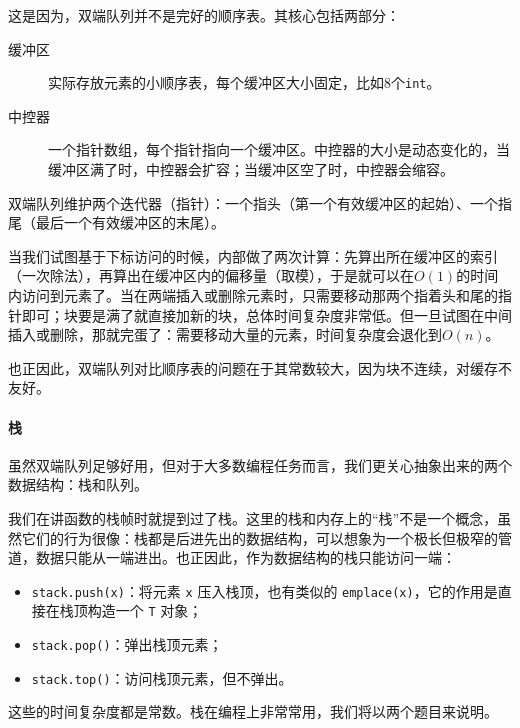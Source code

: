 这是因为，双端队列并不是完好的顺序表。其核心包括两部分：
\begin{description}
    \item[缓冲区] 实际存放元素的小顺序表，每个缓冲区大小固定，比如8个\verb|int|。
    \item[中控器] 一个指针数组，每个指针指向一个缓冲区。中控器的大小是动态变化的，当缓冲区满了时，中控器会扩容；当缓冲区空了时，中控器会缩容。
\end{description}
双端队列维护两个迭代器（指针）：一个指头（第一个有效缓冲区的起始）、一个指尾（最后一个有效缓冲区的末尾）。

当我们试图基于下标访问的时候，内部做了两次计算：先算出所在缓冲区的索引（一次除法），再算出在缓冲区内的偏移量（取模），于是就可以在$O(1)$的时间内访问到元素了。当在两端插入或删除元素时，只需要移动那两个指着头和尾的指针即可；块要是满了就直接加新的块，总体时间复杂度非常低。但一旦试图在中间插入或删除，那就完蛋了：需要移动大量的元素，时间复杂度会退化到$O(n)$。

也正因此，双端队列对比顺序表的问题在于其常数较大，因为块不连续，对缓存不友好。

\paragraph{栈}

虽然双端队列足够好用，但对于大多数编程任务而言，我们更关心抽象出来的两个数据结构：栈和队列。

我们在讲函数的栈帧时就提到过了栈。这里的栈和内存上的“栈”不是一个概念，虽然它们的行为很像：栈都是后进先出的数据结构，可以想象为一个极长但极窄的管道，数据只能从一端进出。也正因此，作为数据结构的栈只能访问一端：
\begin{itemize}
    \item \verb|stack.push(x)|：将元素 \verb|x| 压入栈顶，也有类似的 \verb|emplace(x)|，它的作用是直接在栈顶构造一个 \verb|T| 对象；
    \item \verb|stack.pop()|：弹出栈顶元素；
    \item \verb|stack.top()|：访问栈顶元素，但不弹出。
\end{itemize}
这些的时间复杂度都是常数。栈在编程上非常常用，我们将以两个题目来说明。

